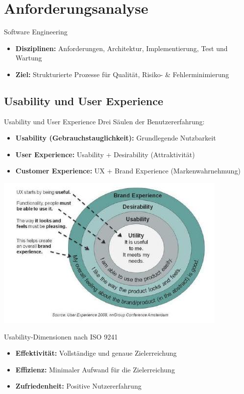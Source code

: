 \section{Anforderungsanalyse}

\begin{definition}{Software Engineering}
\begin{itemize}
    \item \textbf{Disziplinen:} 
    Anforderungen, Architektur, Implementierung, Test und Wartung
    \item \textbf{Ziel:} 
    Strukturierte Prozesse für Qualität, Risiko- \& Fehlerminimierung
\end{itemize}
\end{definition}

\subsection{Usability und User Experience}

\begin{concept}{Usability und User Experience}
Drei Säulen der Benutzererfahrung:
\begin{itemize}
    \item \textbf{Usability (Gebrauchstauglichkeit):} Grundlegende Nutzbarkeit 
    \item \textbf{User Experience:} Usability + Desirability (Attraktivität)
    \item \textbf{Customer Experience:} UX + Brand Experience (Markenwahrnehmung)
\end{itemize}
\includegraphics[width=0.6\linewidth]{images/2024_12_29_0d1d7b5551ea1b4b41bdg-02}
\end{concept}

\begin{definition}{Usability-Dimensionen nach ISO 9241}
\begin{itemize}
    \item \textbf{Effektivität:} Vollständige und genaue Zielerreichung
    \item \textbf{Effizienz:} Minimaler Aufwand für die Zielerreichung
    \item \textbf{Zufriedenheit:} Positive Nutzererfahrung
\end{itemize}
\end{definition}

